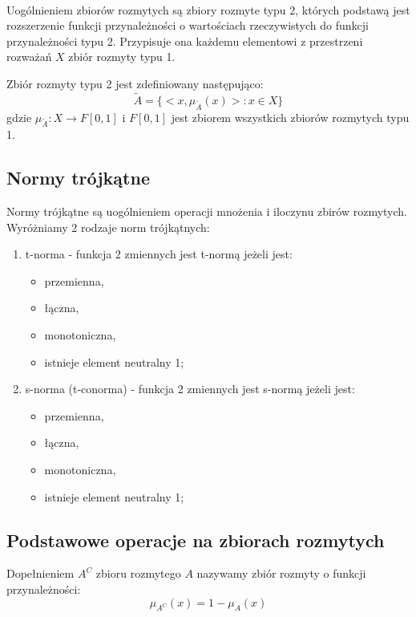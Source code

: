 \documentclass{classrep}
\begin{document}
\paragraph{}
Uogólnieniem zbiorów rozmytych są zbiory rozmyte typu 2, których podstawą jest rozszerzenie funkcji przynależności o wartościach rzeczywistych do funkcji przynależności typu 2. Przypisuje ona każdemu elementowi z przestrzeni rozważań $X$ zbiór rozmyty typu 1.

Zbiór rozmyty typu 2 jest zdefiniowany następująco:
\begin{equation}
\tilde{A}=\{<x, \mu_{\tilde{A}}(x)>:x \in X \}
\end{equation}
gdzie $\mu_{\tilde{A}}:X \rightarrow F[0,1] $ i $F[0,1]$ jest zbiorem wszystkich zbiorów rozmytych typu 1.

\subsection{Normy trójkątne}
Normy trójkątne są uogólnieniem operacji mnożenia i iloczynu zbirów rozmytych. Wyróżniamy 2 rodzaje norm trójkątnych:

\begin{enumerate}
\item t-norma - funkcja 2 zmiennych jest t-normą jeżeli jest:
\begin{itemize}
\item przemienna,
\item łączna,
\item monotoniczna,
\item istnieje element neutralny 1;
\end{itemize}
\item s-norma (t-conorma) - funkcja 2 zmiennych jest s-normą jeżeli jest:
\begin{itemize}
\item przemienna,
\item łączna,
\item monotoniczna,
\item istnieje element neutralny 1;
\end{itemize}
\end{enumerate}

\subsection{Podstawowe operacje na zbiorach rozmytych}
Dopełnieniem $A^C$ zbioru rozmytego $A$ nazywamy zbiór rozmyty o funkcji przynależności:
\begin{equation}
\mu_{A^C}(x)=1-\mu_A(x)
\end{equation}
\end{document}
